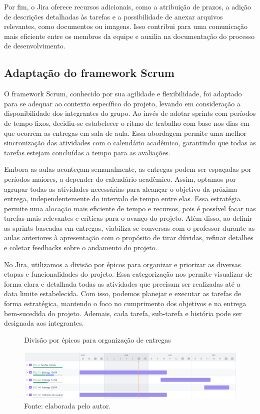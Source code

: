     Por fim, o Jira oferece recursos adicionais, como a atribuição de prazos, a adição de descrições detalhadas às tarefas e a possibilidade de anexar arquivos relevantes, como documentos ou imagens. Isso contribui para uma comunicação mais eficiente entre os membros da equipe e auxilia na documentação do processo de desenvolvimento.

    \subsection{Adaptação do framework Scrum}

    O framework Scrum, conhecido por sua agilidade e flexibilidade, foi adaptado para se adequar ao contexto específico do projeto, levando em consideração a disponibilidade dos integrantes do grupo. Ao invés de adotar sprints com períodos de tempo fixos, decidiu-se estabelecer o ritmo de trabalho com base nos dias em que ocorrem as entregas em sala de aula. Essa abordagem permite uma melhor sincronização das atividades com o calendário acadêmico, garantindo que todas as tarefas estejam concluídas a tempo para as avaliações.

    Embora as aulas aconteçam semanalmente, as entregas podem ser espaçadas por períodos maiores, a depender do calendário acadêmico. Assim, optamos por agrupar todas as atividades necessárias para alcançar o objetivo da próxima entrega, independentemente do intervalo de tempo entre elas. Essa estratégia permite uma alocação mais eficiente de tempo e recursos, pois é possível focar nas tarefas mais relevantes e críticas para o avanço do projeto. Além disso, ao definir as sprints baseadas em entregas, viabiliza-se conversas com o professor durante as aulas anteriores à apresentação com o propósito de tirar dúvidas, refinar detalhes e coletar feedbacks sobre o andamento do projeto.
    
    No Jira, utilizamos a divisão por épicos para organizar e priorizar as diversas etapas e funcionalidades do projeto. Essa categorização nos permite visualizar de forma clara e detalhada todas as atividades que precisam ser realizadas até a data limite estabelecida. Com isso, podemos planejar e executar as tarefas de forma estratégica, mantendo o foco no cumprimento dos objetivos e na entrega bem-sucedida do projeto. Ademais, cada tarefa, sub-tarefa e história pode ser designada aos integrantes.

    \begin{figure}[h!]
        \captionsetup{width=1\textwidth} 
        \caption{\label{fig:epicos_jira} Divisão por épicos para organização de entregas}
        \centering
        \includegraphics[width=1\textwidth]{figuras/epicos_jira}
        \caption*{Fonte: elaborada pelo autor.}
    \end{figure}

